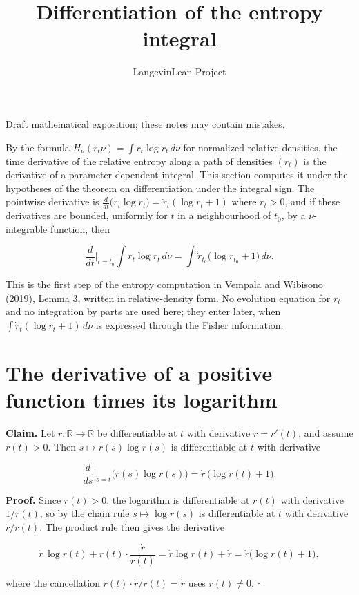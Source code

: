 \documentclass[11pt,a4paper]{article}
\title{\texorpdfstring{Differentiation of the entropy integral}{Differentiation of the entropy integral}}
\author{LangevinLean Project}
\date{}
\begin{document}
\maketitle
Draft mathematical exposition; these notes may contain mistakes.


By the formula \(H_\nu(r_t\nu)=\int r_t\log r_t\,d\nu\) for normalized relative densities, the time derivative of the relative entropy along a path of densities \((r_t)\) is the derivative of a parameter-dependent integral. This section computes it under the hypotheses of the theorem on differentiation under the integral sign. The pointwise derivative is \(\frac{d}{dt}\bigl(r_t\log r_t\bigr)=\dot r_t(\log r_t+1)\) where \(r_t>0\), and if these derivatives are bounded, uniformly for \(t\) in a neighbourhood of \(t_0\), by a \(\nu\)-integrable function, then


\[\frac{d}{dt}\Big|_{t=t_0}\int r_t\log r_t\,d\nu=\int\dot r_{t_0}\bigl(\log r_{t_0}+1\bigr)\,d\nu.\]


This is the first step of the entropy computation in Vempala and Wibisono (2019), Lemma 3, written in relative-density form. No evolution equation for \(r_t\) and no integration by parts are used here; they enter later, when \(\int\dot r_t(\log r_t+1)\,d\nu\) is expressed through the Fisher information.


\section{\texorpdfstring{The derivative of a positive function times its logarithm}{The derivative of a positive function times its logarithm}}


\textbf{Claim.} Let \(r:\mathbb R\to\mathbb R\) be differentiable at \(t\) with derivative \(\dot r=r'(t)\), and assume \(r(t)>0\). Then \(s\mapsto r(s)\log r(s)\) is differentiable at \(t\) with derivative


\[\frac{d}{ds}\Big|_{s=t}\bigl(r(s)\log r(s)\bigr)=\dot r\,\bigl(\log r(t)+1\bigr).\]


\textbf{Proof.} Since \(r(t)>0\), the logarithm is differentiable at \(r(t)\) with derivative \(1/r(t)\), so by the chain rule \(s\mapsto\log r(s)\) is differentiable at \(t\) with derivative \(\dot r/r(t)\). The product rule then gives the derivative


\[\dot r\,\log r(t)+r(t)\cdot\frac{\dot r}{r(t)}=\dot r\log r(t)+\dot r=\dot r\bigl(\log r(t)+1\bigr),\]


where the cancellation \(r(t)\cdot\dot r/r(t)=\dot r\) uses \(r(t)\neq0\). \(\square\)
\end{document}
